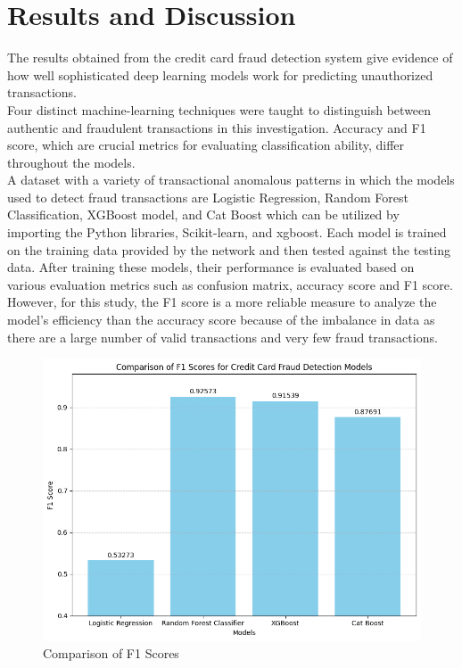 \chapter{Results and Discussion}
\label{ch:results}


The results obtained from the credit card fraud detection system give evidence of how well sophisticated deep learning models work for predicting unauthorized transactions. \\Four distinct machine-learning techniques were taught to distinguish between authentic and fraudulent transactions in this investigation. Accuracy and F1 score, which are crucial metrics for evaluating classification ability, differ throughout the models.\\ A dataset with a variety of transactional anomalous patterns in which the models used to detect fraud transactions are Logistic Regression, Random Forest Classification, XGBoost model, and Cat Boost which can be utilized by importing the Python libraries, Scikit-learn, and xgboost. Each model is trained on the training data provided by the network and then tested against the testing data. After training these models, their performance is evaluated based on various evaluation metrics such as confusion matrix, accuracy score and F1 score. However, for this study, the F1 score is a more reliable measure to analyze the model’s efficiency than the accuracy score because of the imbalance in data as there are a large number of valid transactions and very few fraud transactions. 



 \begin{figure}[ht]
    \centering
    \includegraphics[scale=0.5]{figures/FinalPlot.png}
    \caption{Comparison of F1 Scores}
    \label{fig:Data Preprocessing}
\end{figure}
\clearpage



